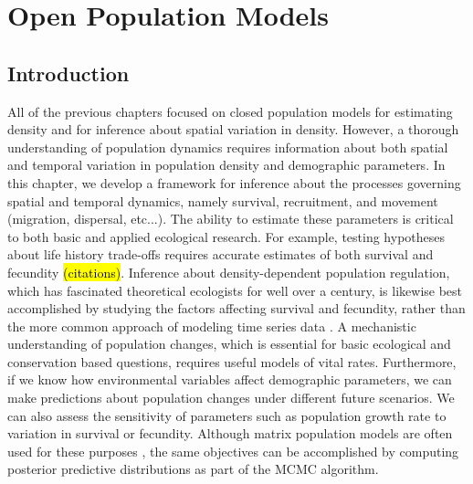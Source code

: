 \chapter{Open Population Models}
\label{chapt.open}


\vspace{0.3cm}


\section{Introduction}

All of the previous chapters focused on closed population models
for estimating density and for inference about spatial variation in density.
However, a thorough
understanding of population dynamics %
requires information about both
spatial and  temporal variation in population density and demographic parameters.
In this chapter,
we develop a framework for
inference about the processes governing spatial and temporal dynamics,
namely survival, recruitment, and movement (migration, dispersal, etc...).
The ability to estimate these parameters is critical to both basic and
applied ecological research. For example, testing hypotheses about
life history trade-offs requires accurate estimates of both survival
and fecundity \hl{(citations)}.
Inference about density-dependent population
regulation, which has fascinated theoretical ecologists for well over
a century,
is likewise best accomplished by studying
the factors affecting survival and fecundity, rather than the more common approach of
modeling time series data \citep{nichols_etal:2000}.  A mechanistic understanding 
of population changes, which is essential for basic ecological and conservation based questions,
requires useful models of vital
rates. Furthermore, if we know how environmental
variables affect demographic parameters, we can make predictions about
population changes under different future scenarios. We can also assess
the sensitivity of parameters such as population growth rate to
variation in survival or fecundity. Although matrix
population models are often used for these purposes \citep{caswell:1989,saether_bakke:2000}, the same
objectives can be accomplished by computing posterior predictive
distributions as part of the MCMC algorithm.

